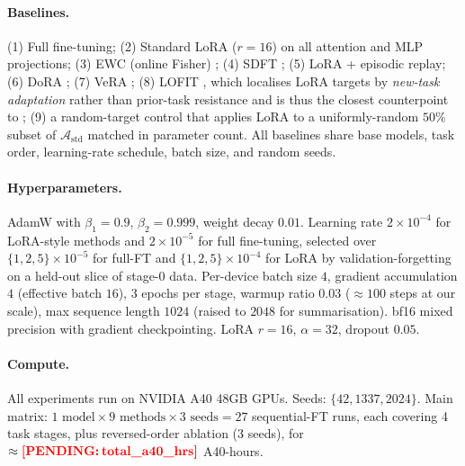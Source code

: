 \paragraph{Baselines.}
(1) Full fine-tuning; (2) Standard LoRA ($r{=}16$) on all attention and MLP projections; (3) EWC (online Fisher) \citep{kirkpatrick2017ewc}; (4) SDFT \citep{shi2024sdft}; (5) LoRA + episodic replay; (6) DoRA \citep{liu2024dora}; (7) VeRA \citep{kopiczko2024vera}; (8) LOFIT \citep{yin2024lofit}, which localises LoRA targets by \textit{new-task adaptation} rather than prior-task resistance and is thus the closest counterpoint to \tglora{}; (9) a random-target control that applies LoRA to a uniformly-random $50\%$ subset of $\mathcal{A}_{\mathrm{std}}$ matched in parameter count. All baselines share base models, task order, learning-rate schedule, batch size, and random seeds.

\paragraph{Hyperparameters.} AdamW \citep{loshchilov2019adamw} with $\beta_1{=}0.9$, $\beta_2{=}0.999$, weight decay $0.01$. Learning rate $2\!\times\!10^{-4}$ for LoRA-style methods and $2\!\times\!10^{-5}$ for full fine-tuning, selected over $\{1, 2, 5\}\!\times\!10^{-5}$ for full-FT and $\{1, 2, 5\}\!\times\!10^{-4}$ for LoRA by validation-forgetting on a held-out slice of stage-0 data. Per-device batch size $4$, gradient accumulation $4$ (effective batch $16$), $3$ epochs per stage, warmup ratio $0.03$ ($\approx100$ steps at our scale), max sequence length $1024$ (raised to $2048$ for summarisation). bf16 mixed precision with gradient checkpointing. LoRA $r{=}16$, $\alpha{=}32$, dropout $0.05$.

\paragraph{Compute.} All experiments run on NVIDIA A40 48GB GPUs. Seeds: $\{42, 1337, 2024\}$. Main matrix: $1\text{ model} \times 9\text{ methods} \times 3\text{ seeds} = 27$ sequential-FT runs, each covering 4 task stages, plus reversed-order ablation ($3$ seeds), for $\approx \pend{total_a40_hrs}$ A40-hours.
